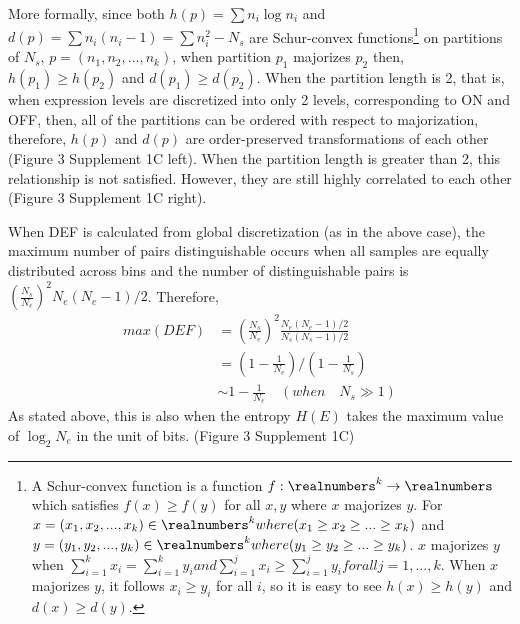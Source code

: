 More formally, since both $h(p) = \sum{n_i\log n_i}$ and $d(p) = \sum n_i(n_i-1) = \sum n_i^2 - N_s$ are Schur-convex functions\footnote{A Schur-convex function is a function $f:\realnumbers^k \rightarrow \realnumbers$ which satisfies $f(x) \geq f(y)$ for all $x,y$ where $x$ majorizes $y$. For $x=(x_1,x_2,...,x_k) \in \realnumbers^k where (x_1 \geq x_2 \geq ... \geq x_k) $ and $y=(y_1,y_2,...,y_k) \in \realnumbers^k where (y_1 \geq y_2 \geq ... \geq y_k)$. $x$ majorizes $y$ when $\sum_{i=1}^{k} x_i = \sum_{i=1}^{k} y_i and \sum_{i=1}^{j} x_i \geq \sum_{i=1}^{j} y_i for all j=1,...,k$. When $x$ majorizes $y$, it follows $x_i \geq y_i$ for all $i$, so it is easy to see $h(x) \geq h(y)$ and $d(x) \geq d(y)$.} on partitions of $N_s$,  $p=(n_1,n_2,...,n_k)$, when partition $p_1$ majorizes $p_2$ then, $h(p_1)\geq h(p_2)$ and $d(p_1)\geq d(p_2)$. When the partition length is 2, that is, when expression levels are discretized into only 2 levels, corresponding to ON and OFF, then, all of the partitions can be ordered with respect to majorization, therefore, $h(p)$ and $d(p)$ are order-preserved transformations of each other (Figure 3 Supplement 1C left). When the partition length is greater than 2, this relationship is not satisfied. However, they are still highly correlated to each other (Figure 3 Supplement 1C right). 

When DEF is calculated from global discretization (as in the above case), the maximum number of pairs distinguishable occurs when all samples are equally distributed across bins and the number of distinguishable pairs is $\left( \frac{N_s}{N_e}\right)^2N_e(N_e-1)/2$. Therefore,
\begin{align}
max(DEF) &= \left( \frac{N_s}{N_e}\right)^2 \frac{N_e(N_e-1)/2}{N_s(N_s-1)/2}\\
		&= \left( 1 - \frac{1}{N_e} \right) / \left( 1 - \frac{1}{N_s} \right) \\
        &\sim 1 - \frac{1}{N_e} \quad(when\quad N_s \gg 1)
\end{align}
As stated above, this is also when the entropy $H(E)$ takes the maximum value of $\log_{2} N_e$ in the unit of bits. (Figure 3 Supplement 1C)
